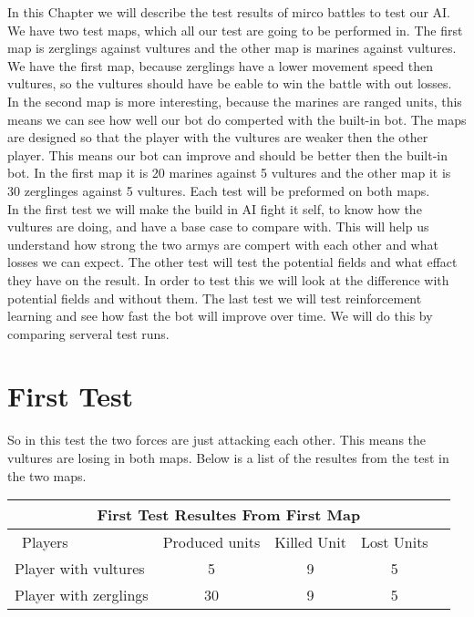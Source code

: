 In this Chapter we will describe the test results of mirco battles to test our AI. We have two test maps, which all our test are going to be performed in.
The first map is  zerglings against vultures and the other map is marines against vultures. We have the first map, because zerglings have a lower movement
speed then vultures, so the vultures should have be eable to win the battle with out losses. In the second map is more interesting, because the marines
are ranged units, this means we can see how well our bot do comperted with the built-in bot. The maps are  designed so that the player with the vultures
are weaker then the other player. This means our bot can improve and should be better then the built-in bot. In the first map it is 20 marines against 5
vultures and the other map it is 30 zerglinges against 5 vultures. Each test will be preformed on both maps. \\

 In the first test we will make the build in AI fight it self, to know how the vultures are doing, and have a base case to compare with. This will help us understand how strong the
two armys are compert with each other and what losses we can expect. The other test will test the potential fields and what effact they have on the result.
In order to test this we will look at the difference with potential fields and without them. The last test we will test reinforcement learning and see how
fast the bot will improve over time. We will do this by comparing serveral test runs.

\section{First Test}
So in this test the two forces are just attacking each other. This means the vultures are losing in both maps. Below is a list of the resultes from the test
in the two maps.

\begin{centering}
 \begin{tabular}{|l||c|c|c|c|}
	\multicolumn{5}{c}{First Test Resultes From First Map} \\
	\hline
	\ Players & Produced units & Killed Unit & Lost Units\\
	\hline
	\hline
		Player with vultures & 5 & 9 & 5 \\
	\hline
		Player with zerglings & 30 & 9 & 5\\
	\hline

\end{tabular}
\end{centering}

